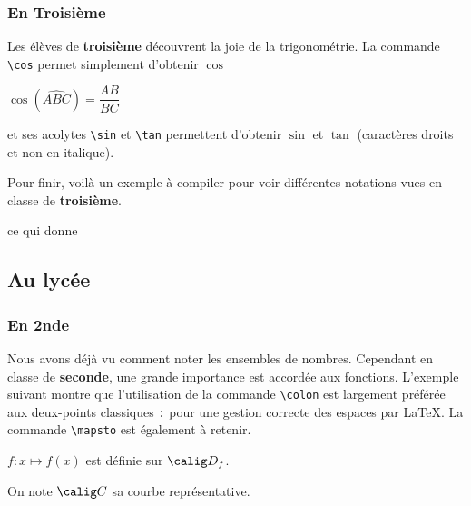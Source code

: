 


\subsubsection{En Troisième}

Les élèves de \textbf{troisième} découvrent la joie de la trigonométrie. La commande \texttt{\textbackslash cos} permet simplement d'obtenir $\cos$ 

{
\begin{SideBySideExample}
    $\cos\left(\widehat{ABC}\right) = \dfrac{AB}{BC}$
\end{SideBySideExample}
}\bigskip

et ses acolytes  \texttt{\textbackslash sin} et \texttt{\textbackslash tan} permettent d'obtenir $\sin$ et $\tan$ (caractères droits et non en italique).

Pour finir, voilà un exemple à compiler pour voir différentes notations vues en classe de \textbf{troisième}. 


ce qui donne 

\medskip



\subsection{Au lycée}

\subsubsection{En 2nde}

Nous avons déjà vu comment noter les ensembles de nombres. Cependant en classe de \textbf{seconde}, une grande importance est accordée aux fonctions. L'exemple suivant montre que l'utilisation de la commande \texttt{\textbackslash colon} est largement préférée aux deux-points classiques \verb!:! pour une gestion correcte des espaces par \LaTeX. La commande \texttt{\textbackslash mapsto} est également à retenir.\bigskip

{
\begin{SideBySideExample}
    $f\colon x \mapsto f(x)$ est d\'efinie sur
                                $\calig D_f$.

    On note $\calig C$ sa courbe repr\'esentative.
\end{SideBySideExample}
}\bigskip

